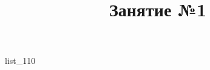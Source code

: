 \documentclass[12pt, a4paper]{article}
\begin{document}
	\title{Занятие №1}
	{list_110}
\end{document}
